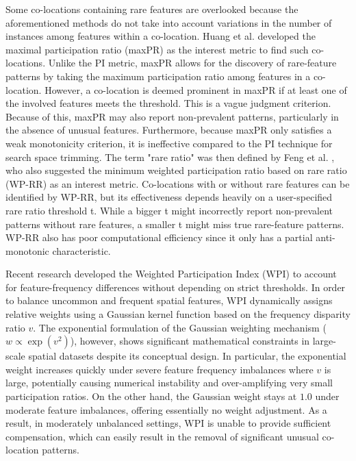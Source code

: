 \documentclass[12pt, letterpaper]{template}
\theoremstyle{definition}
\begin{document}
Some co-locations containing rare features are overlooked because the aforementioned methods do not take into account variations in the number of instances among features within a co-location. Huang et al. \cite{huang2006mining} developed the maximal participation ratio (maxPR) as the interest metric to find such co-locations. Unlike the PI metric, maxPR allows for the discovery of rare-feature patterns by taking the maximum participation ratio among features in a co-location. However, a co-location is deemed prominent in maxPR if at least one of the involved features meets the threshold. This is a vague judgment criterion. Because of this, maxPR may also report non-prevalent patterns, particularly in the absence of unusual features. Furthermore, because maxPR only satisfies a weak monotonicity criterion, it is ineffective compared to the PI technique for search space trimming. The term "rare ratio" was then defined by Feng et al. \cite{ling2015new}, who also suggested the minimum weighted participation ratio based on rare ratio (WP-RR) as an interest metric. Co-locations with or without rare features can be identified by WP-RR, but its effectiveness depends heavily on a user-specified rare ratio threshold t. While a bigger t might incorrectly report non-prevalent patterns without rare features, a smaller t might miss true rare-feature patterns. WP-RR also has poor computational efficiency since it only has a partial anti-monotonic characteristic.

Recent research developed the Weighted Participation Index ($\mathrm{WPI}$) \cite{yang2021efficient} to account for feature-frequency differences without depending on strict thresholds. In order to balance uncommon and frequent spatial features, $\mathrm{WPI}$ dynamically assigns relative weights using a Gaussian kernel function based on the frequency disparity ratio $v$. The exponential formulation of the Gaussian weighting mechanism ($w \propto \exp(v^2)$), however, shows significant mathematical constraints in large-scale spatial datasets despite its conceptual design. In particular, the exponential weight increases quickly under severe feature frequency imbalances where $v$ is large, potentially causing numerical instability and over-amplifying very small participation ratios. On the other hand, the Gaussian weight stays at $1.0$ under moderate feature imbalances, offering essentially no weight adjustment. As a result, in moderately unbalanced settings, $\mathrm{WPI}$ is unable to provide sufficient compensation, which can easily result in the removal of significant unusual co-location patterns.
\end{document}
